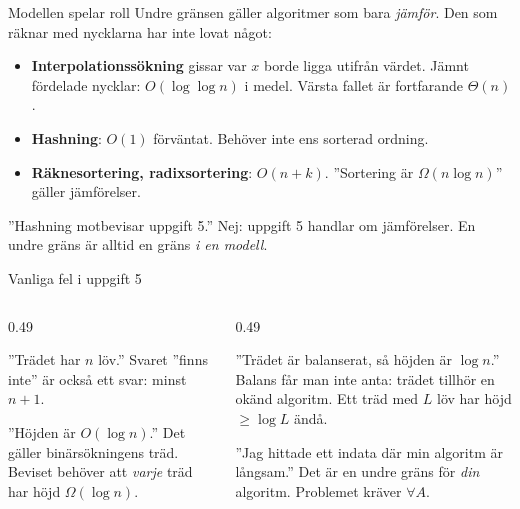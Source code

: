 {\kaninbg
\begin{frame}{\kh Modellen spelar roll}
\small
Undre gränsen gäller algoritmer som bara \emph{jämför}. Den som räknar med nycklarna har inte
lovat något:
\begin{itemize}\setlength{\itemsep}{3pt}
  \item \textbf{Interpolationssökning} gissar var $x$ borde ligga utifrån värdet. Jämnt
        fördelade nycklar: $O(\log\log n)$ i medel. Värsta fallet är fortfarande $\Theta(n)$.
  \item \textbf{Hashning}: $O(1)$ förväntat. Behöver inte ens sorterad ordning.
  \item \textbf{Räknesortering, radixsortering}: $O(n+k)$. ”Sortering är $\Omega(n\log n)$”
        gäller jämförelser.
\end{itemize}
\vfill
\begin{missbox}[fontupper=\footnotesize]
”Hashning motbevisar uppgift 5.” Nej: uppgift 5 handlar om jämförelser. En undre gräns är
alltid en gräns \emph{i en modell}.
\end{missbox}
\end{frame}}

\begin{frame}{Vanliga fel i uppgift 5}
\begin{columns}[T]
\begin{column}{0.49\textwidth}
\begin{missbox}[fontupper=\footnotesize]
”Trädet har $n$ löv.” Svaret ”finns inte” är också ett svar: minst $n+1$.
\end{missbox}
\begin{missbox}[fontupper=\footnotesize]
”Höjden är $O(\log n)$.” Det gäller binärsökningens träd. Beviset behöver att \emph{varje}
träd har höjd $\Omega(\log n)$.
\end{missbox}
\end{column}
\begin{column}{0.49\textwidth}
\begin{missbox}[fontupper=\footnotesize]
”Trädet är balanserat, så höjden är $\log n$.” Balans får man inte anta: trädet tillhör en
okänd algoritm. Ett träd med $L$ löv har höjd $\ge\log L$ ändå.
\end{missbox}
\begin{missbox}[fontupper=\footnotesize]
”Jag hittade ett indata där min algoritm är långsam.” Det är en undre gräns för \emph{din}
algoritm. Problemet kräver $\forall A$.
\end{missbox}
\end{column}
\end{columns}
\end{frame}
